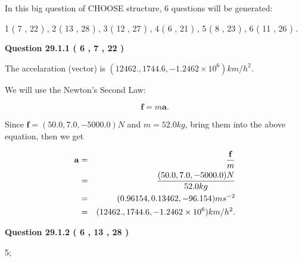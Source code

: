 \documentclass[12pt]{article}
\begin{document}
   
\vspace{0.2in}
   
 In this big question of CHOOSE structure,            6  questions will be generated: 
  
  
             1 (           7 ,          22 )
 ,
             2 (          13 ,          28 )
 ,
             3 (          12 ,          27 )
 ,
             4 (           6 ,          21 )
 ,
             5 (           8 ,          23 )
 ,
             6 (          11 ,          26 )
 .
  
\vspace{0.2in}
  
{\textbf{\Large{Question
29.1.1 
 (           6 ,           7 ,          22 )
}}}
  
  
 
 
\noindent{}
 
 
The accelaration (vector) is
$(
12462.,
1744.6 ,
-1.2462 \times 10^{6}
)km/h^2.
$
 
 
 
 
 
 
\noindent{}

We will use the Newton's Second Law:
 
\[
\mathbf{f}=m\mathbf{a}.
\]
 
Since $\mathbf{f}=( %
50.0,  %
7.0,  %
-5000.0 )N$
and $m= %
52.0 kg$, bring them into the above equation, then we get
 
\begin{eqnarray*}
\mathbf{a}&=&\frac{\mathbf{f}}m  \\
&=&\frac{(
50.0 ,
7.0 ,
-5000.0 )N
}{ %
52.0 kg}  \\
&=&(
0.96154 ,
0.13462,
-96.154
)ms^{-2} \\
&=&(
12462. ,
1744.6 ,
-1.2462 \times 10^{6}
)km/h^2.
\end{eqnarray*}
 
 
 
  
\vspace{0.2in}
  
{\textbf{\Large{Question
29.1.2 
 (           6 ,          13 ,          28 )
}}}
  
  
 
 
\noindent{}

5;
 
\end{document}
